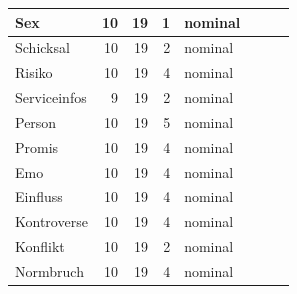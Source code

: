 \documentclass[twoside, pagesize, fontsize=11pt, dvipsnames]{scrreport}
\begin{document}
\begin{table}
\begin{tabular}[t]{l|r|r|r|l|>{}r|>{}r|>{}r}
\hline
Sex & 10 & 19 & 1 & nominal & \cellcolor[HTML]{30123B}{\textcolor{white}{1.00}} & \cellcolor[HTML]{30123B}{\textcolor{white}{1.00}} & \cellcolor[HTML]{30123B}{\textcolor{white}{1.00}}\\
\hline
Schicksal & 10 & 19 & 2 & nominal & \cellcolor[HTML]{F5C53A}{\textcolor{black}{0.36}} & \cellcolor[HTML]{3CF58E}{\textcolor{black}{0.83}} & \cellcolor[HTML]{D9E436}{\textcolor{black}{0.66}}\\
\hline
Risiko & 10 & 19 & 4 & nominal & \cellcolor[HTML]{ED5510}{\textcolor{white}{0.20}} & \cellcolor[HTML]{AF1801}{\textcolor{white}{0.59}} & \cellcolor[HTML]{B21A01}{\textcolor{white}{0.46}}\\
\hline
Serviceinfos & 9 & 19 & 2 & nominal & \cellcolor[HTML]{DA3907}{\textcolor{white}{0.15}} & \cellcolor[HTML]{3CF58E}{\textcolor{black}{0.83}} & \cellcolor[HTML]{D9E436}{\textcolor{black}{0.66}}\\
\hline
Person & 10 & 19 & 5 & nominal & \cellcolor[HTML]{FE932A}{\textcolor{white}{0.28}} & \cellcolor[HTML]{E2430A}{\textcolor{black}{0.63}} & \cellcolor[HTML]{EC530F}{\textcolor{white}{0.53}}\\
\hline
Promis & 10 & 19 & 4 & nominal & \cellcolor[HTML]{D4E735}{\textcolor{black}{0.43}} & \cellcolor[HTML]{E7D739}{\textcolor{black}{0.73}} & \cellcolor[HTML]{EBD339}{\textcolor{black}{0.64}}\\
\hline
Emo & 10 & 19 & 4 & nominal & \cellcolor[HTML]{DA3907}{\textcolor{white}{0.15}} & \cellcolor[HTML]{FE932A}{\textcolor{black}{0.68}} & \cellcolor[HTML]{FC8725}{\textcolor{white}{0.57}}\\
\hline
Einfluss & 10 & 19 & 4 & nominal & \cellcolor[HTML]{84FF51}{\textcolor{black}{0.54}} & \cellcolor[HTML]{65FD69}{\textcolor{black}{0.81}} & \cellcolor[HTML]{65FD69}{\textcolor{black}{0.75}}\\
\hline
Kontroverse & 10 & 19 & 4 & nominal & \cellcolor[HTML]{E5D938}{\textcolor{black}{0.40}} & \cellcolor[HTML]{92FF47}{\textcolor{black}{0.79}} & \cellcolor[HTML]{96FE44}{\textcolor{black}{0.72}}\\
\hline
Konflikt & 10 & 19 & 2 & nominal & \cellcolor[HTML]{BE2102}{\textcolor{white}{0.10}} & \cellcolor[HTML]{3D9EFE}{\textcolor{white}{0.91}} & \cellcolor[HTML]{18DBC5}{\textcolor{black}{0.82}}\\
\hline
Normbruch & 10 & 19 & 4 & nominal & \cellcolor[HTML]{18E0BD}{\textcolor{black}{0.68}} & \cellcolor[HTML]{1AD4D0}{\textcolor{black}{0.87}} & \cellcolor[HTML]{18DBC5}{\textcolor{black}{0.82}}\\

\end{tabular}
\end{table}
\end{document}
